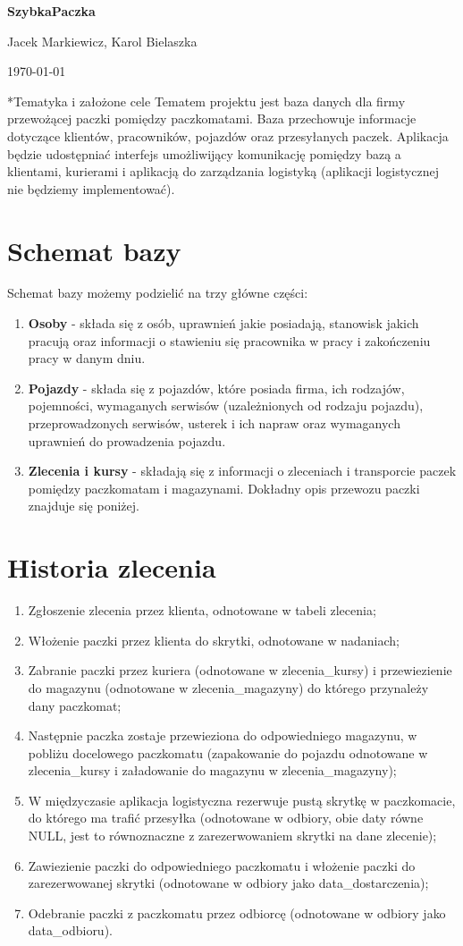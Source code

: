\documentclass{article} %
\newcommand{\maketitletwo}[2][]{\begin{center}
        \Large{\textbf{SzybkaPaczka}} %
        \vspace{5pt}
        
        \normalsize{Jacek Markiewicz, Karol Bielaszka %
        
        \today}        %
        \vspace{15pt}
        
\end{center}}
\begin{document}
    \maketitletwo[5] 
    
\section*{Tematyka i założone cele}
\noindent Tematem projektu jest baza danych dla firmy przewożącej paczki pomiędzy paczkomatami. Baza przechowuje informacje dotyczące klientów, pracowników, pojazdów oraz przesyłanych paczek. Aplikacja będzie udostępniać interfejs umożliwijący komunikację pomiędzy bazą a klientami, kurierami i aplikacją do zarządzania logistyką (aplikacji logistycznej nie będziemy implementować). 
\section*{Schemat bazy}
    Schemat bazy możemy podzielić na trzy główne części:
    \begin{enumerate}
        \item \textbf{Osoby} - składa się z osób, uprawnień jakie posiadają, stanowisk jakich pracują oraz informacji o stawieniu się pracownika w pracy i zakończeniu pracy w danym dniu.
        \item \textbf{Pojazdy} - składa się z pojazdów, które posiada firma, ich rodzajów, pojemności, wymaganych serwisów (uzależnionych od rodzaju pojazdu), przeprowadzonych serwisów, usterek i ich napraw oraz wymaganych uprawnień do prowadzenia pojazdu.
        \item \textbf{Zlecenia i kursy} - składają się z informacji o zleceniach i transporcie paczek pomiędzy paczkomatam i magazynami. Dokładny opis przewozu paczki znajduje się poniżej.
    \end{enumerate}
\noindent 
\section*{Historia zlecenia}
    \begin{enumerate}
        \item Zgłoszenie zlecenia przez klienta, odnotowane w tabeli zlecenia;
        \item Włożenie paczki przez klienta do skrytki, odnotowane w nadaniach;
        \item Zabranie paczki przez kuriera (odnotowane w zlecenia\_kursy) i przewiezienie do magazynu (odnotowane w zlecenia\_magazyny) do którego przynależy dany paczkomat;
        \item Następnie paczka zostaje przewieziona do odpowiedniego magazynu, w pobliżu docelowego paczkomatu (zapakowanie do pojazdu odnotowane w zlecenia\_kursy i załadowanie do magazynu w zlecenia\_magazyny);
        \item W międzyczasie aplikacja logistyczna rezerwuje pustą skrytkę w paczkomacie, do którego ma trafić przesyłka (odnotowane w odbiory, obie daty równe NULL, jest to równoznaczne z zarezerwowaniem skrytki na dane zlecenie);
        \item Zawiezienie paczki do odpowiedniego paczkomatu i włożenie paczki do zarezerwowanej skrytki (odnotowane w odbiory jako data\_dostarczenia);
        \item Odebranie paczki z paczkomatu przez odbiorcę (odnotowane w odbiory jako data\_odbioru).
    \end{enumerate}
\end{document}
